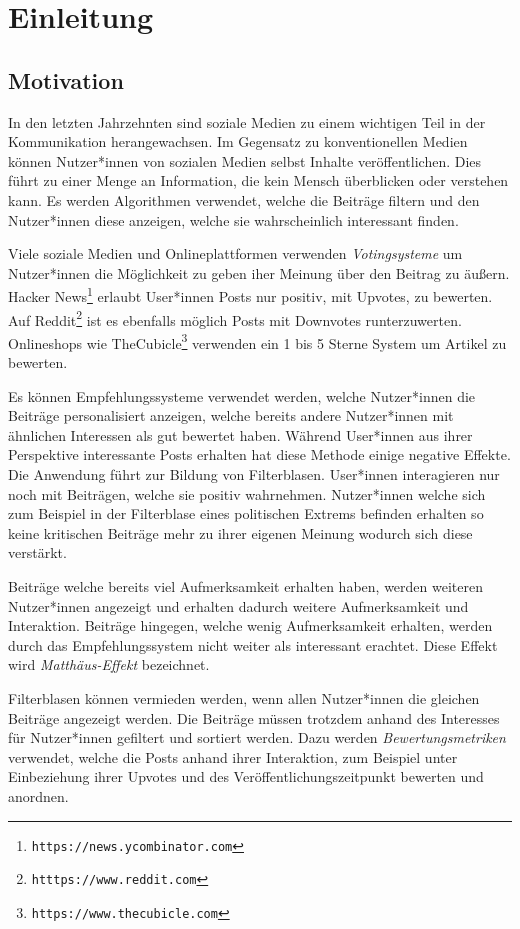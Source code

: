 \chapter{Einleitung}

\section{Motivation}

In den letzten Jahrzehnten sind soziale Medien zu einem wichtigen Teil in der Kommunikation herangewachsen. Im Gegensatz zu konventionellen Medien können Nutzer*innen von sozialen Medien selbst Inhalte veröffentlichen. Dies führt zu einer Menge an Information, die kein Mensch überblicken oder verstehen kann. Es werden Algorithmen verwendet, welche die Beiträge filtern und den Nutzer*innen diese anzeigen, welche sie wahrscheinlich interessant finden. 

Viele soziale Medien und Onlineplattformen verwenden \textit{Votingsysteme} um Nutzer*innen die Möglichkeit zu geben iher Meinung über den Beitrag zu äußern. Hacker News\footnote{\texttt{https://news.ycombinator.com}} erlaubt User*innen Posts nur positiv, mit Upvotes, zu bewerten. Auf Reddit\footnote{\texttt{htttps://www.reddit.com}} ist es ebenfalls möglich Posts mit Downvotes runterzuwerten. Onlineshops wie TheCubicle\footnote{\texttt{https://www.thecubicle.com}} verwenden ein 1 bis 5 Sterne System um Artikel zu bewerten.

Es können Empfehlungssysteme verwendet werden, welche Nutzer*innen die Beiträge personalisiert anzeigen, welche bereits andere Nutzer*innen mit ähnlichen Interessen als gut bewertet haben. Während User*innen aus ihrer Perspektive interessante Posts erhalten hat diese Methode einige negative Effekte. Die Anwendung führt zur Bildung von Filterblasen. User*innen interagieren nur noch mit Beiträgen, welche sie positiv wahrnehmen. Nutzer*innen welche sich zum Beispiel in der Filterblase eines politischen Extrems befinden erhalten so keine kritischen Beiträge mehr zu ihrer eigenen Meinung wodurch sich diese verstärkt. 

Beiträge welche bereits viel Aufmerksamkeit erhalten haben, werden weiteren Nutzer*innen angezeigt und erhalten dadurch weitere Aufmerksamkeit und Interaktion. Beiträge hingegen, welche wenig Aufmerksamkeit erhalten, werden durch das Empfehlungssystem nicht weiter als interessant erachtet. Diese Effekt wird \textit{Matthäus-Effekt} bezeichnet.

Filterblasen können vermieden werden, wenn allen Nutzer*innen die gleichen Beiträge angezeigt werden. Die Beiträge müssen trotzdem anhand des Interesses für Nutzer*innen gefiltert und sortiert werden. Dazu werden \textit{Bewertungsmetriken} verwendet, welche die Posts anhand ihrer Interaktion, zum Beispiel unter Einbeziehung ihrer Upvotes und des Veröffentlichungszeitpunkt bewerten und anordnen.

